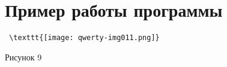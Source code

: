 \documentclass{article}
\begin{document}
\bigskip

\clearpage\section{Пример работы программы}
\begin{verbatim}
 \texttt{[image: qwerty-img011.png]} 

\end{verbatim}
Рисунок 9


\bigskip
\end{document}
